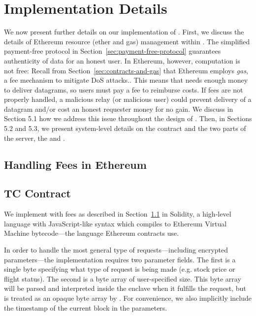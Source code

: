 
\section{\tc Implementation Details}
\label{sec:impl}

We now present further details on our implementation of \tc. First, we discuss the details of Ethereum resource (ether and gas) management within \tc. The simplified payment-free protocol in Section~\ref{sec:payment-free-protocol} guarantees authenticity of data for an honest user.
In Ethereum, however, computation is not free: Recall from Section~\ref{sec:contracts-and-gas} that Ethereum employs \emph{gas}, a fee mechanism to mitigate DoS attacks.. This means that \tc needs enough money to deliver datagrams, so users must pay a fee to reimburse costs. If fees are not properly handled, a malicious relay (or malicious user) could prevent delivery of a datagram and/or cost an honest requester money for no gain. We discuss in Section 5.1 how we address this issue throughout the design of \tc. Then, in Sections 5.2 and 5.3, we present system-level details on the \tc contract \tcont and the two parts of the \tc server, the \encname and \medname.


\subsection{Handling Fees in Ethereum}
\label{sec:gas-protocol}



\subsection{TC Contract}

We implement \tcont with fees as described in Section~\ref{sec:gas-protocol} in Solidity,
a high-level language with JavaScript-like syntax which compiles to Ethereum Virtual Machine bytecode---the language Ethereum contracts use.

In order to handle the most general type of requests---including encrypted parameters---the \tcont implementation requires two parameter fields.
The first is a single byte specifying what type of request is being made (e.g. stock price or flight status).
The second is a byte array of user-specified size.
This byte array will be parsed and interpreted inside the enclave when it fulfills the request, but is treated as an opaque byte array by \tcont.
For convenience, we also implicitly include the timestamp of the current block in the parameters.

